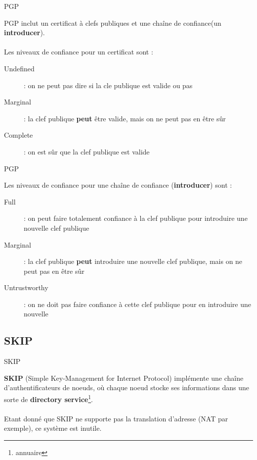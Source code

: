 \documentclass{bredelebeamer}
\begin{document}
\begin{frame}{PGP}

	PGP inclut un certificat à clefs publiques et une chaîne de confiance(un \textbf{introducer}).\\
	\hfill \\
	Les niveaux de confiance pour un certificat sont :
	\begin{description}
		\item [Undefined] : on ne peut pas dire si la cle publique est valide ou pas
		\item [Marginal] : la clef publique \textbf{peut} être valide, mais on ne peut pas en être sûr
		\item [Complete] : on est sûr que la clef publique est valide
	\end{description}
	

\end{frame}

\begin{frame}{PGP}

	Les niveaux de confiance pour une chaîne de confiance (\textbf{introducer}) sont :
	\begin{description}
		\item [Full] : on peut faire totalement confiance à la clef publique pour introduire une nouvelle clef publique 
		\item [Marginal] : la clef publique \textbf{peut} introduire une nouvelle clef publique, mais on ne peut pas en être sûr
		\item [Untrustworthy] : on ne doit pas faire confiance à cette clef publique pour en introduire une nouvelle
	\end{description}

\end{frame}

\subsection{SKIP}

\begin{frame}{SKIP}

	\textbf{SKIP} (Simple Key-Management for Internet Protocol) implémente une chaîne d'authentificateurs de noeuds, où chaque noeud stocke ses informations dans une sorte de \textbf{directory service}\footnote{annuaire}.\\
	\hfill\\
	Etant donné que SKIP ne supporte pas la translation d'adresse (NAT par exemple), ce système est inutile.

\end{frame}
\end{document}
